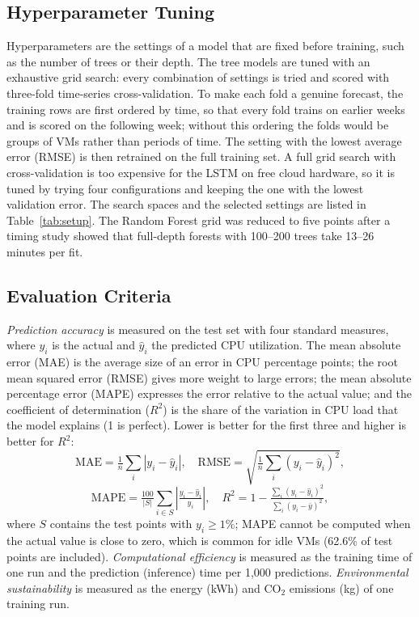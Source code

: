 \documentclass[conference,letterpaper,10pt]{IEEEtran}
\begin{document}
\subsection{Hyperparameter Tuning}
Hyperparameters are the settings of a model that are fixed before training, such as the number of trees or their depth. The tree models are tuned with an exhaustive grid search: every combination of settings is tried and scored with three-fold time-series cross-validation. To make each fold a genuine forecast, the training rows are first ordered by time, so that every fold trains on earlier weeks and is scored on the following week; without this ordering the folds would be groups of VMs rather than periods of time. The setting with the lowest average error (RMSE) is then retrained on the full training set. A full grid search with cross-validation is too expensive for the LSTM on free cloud hardware, so it is tuned by trying four configurations and keeping the one with the lowest validation error. The search spaces and the selected settings are listed in Table~\ref{tab:setup}. The Random Forest grid was reduced to five points after a timing study showed that full-depth forests with 100--200 trees take 13--26 minutes per fit.


\subsection{Evaluation Criteria}
\textit{Prediction accuracy} is measured on the test set with four standard measures, where $y_i$ is the actual and $\hat{y}_i$ the predicted CPU utilization. The mean absolute error (MAE) is the average size of an error in CPU percentage points; the root mean squared error (RMSE) gives more weight to large errors; the mean absolute percentage error (MAPE) expresses the error relative to the actual value; and the coefficient of determination ($R^2$) is the share of the variation in CPU load that the model explains (1 is perfect). Lower is better for the first three and higher is better for $R^2$:
\begin{equation}
\mathrm{MAE}=\tfrac{1}{n}\textstyle\sum_{i}|y_i-\hat{y}_i|,\quad
\mathrm{RMSE}=\sqrt{\tfrac{1}{n}\textstyle\sum_{i}(y_i-\hat{y}_i)^2},
\end{equation}
\begin{equation}
\mathrm{MAPE}=\tfrac{100}{|S|}\textstyle\sum_{i\in S}\left|\tfrac{y_i-\hat{y}_i}{y_i}\right|,\quad
R^2=1-\tfrac{\sum_i (y_i-\hat{y}_i)^2}{\sum_i (y_i-\bar{y})^2},
\end{equation}
where $S$ contains the test points with $y_i\geq1\%$; MAPE cannot be computed when the actual value is close to zero, which is common for idle VMs (62.6\% of test points are included). \textit{Computational efficiency} is measured as the training time of one run and the prediction (inference) time per 1{,}000 predictions. \textit{Environmental sustainability} is measured as the energy (kWh) and CO$_2$ emissions (kg) of one training run.
\end{document}
